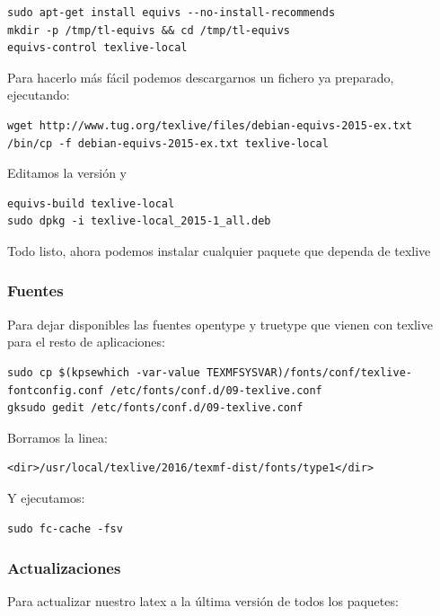 \documentclass[12pt,spanish,]{scrartcl}
\begin{document}
\begin{verbatim}
sudo apt-get install equivs --no-install-recommends
mkdir -p /tmp/tl-equivs && cd /tmp/tl-equivs
equivs-control texlive-local
\end{verbatim}

Para hacerlo más fácil podemos descargarnos un fichero ya preparado,
ejecutando:

\begin{verbatim}
wget http://www.tug.org/texlive/files/debian-equivs-2015-ex.txt
/bin/cp -f debian-equivs-2015-ex.txt texlive-local
\end{verbatim}

Editamos la versión y

\begin{verbatim}
equivs-build texlive-local
sudo dpkg -i texlive-local_2015-1_all.deb
\end{verbatim}

Todo listo, ahora podemos instalar cualquier paquete que dependa de
texlive

\subsubsection{Fuentes}\label{fuentes}

Para dejar disponibles las fuentes opentype y truetype que vienen con
texlive para el resto de aplicaciones:

\begin{verbatim}
sudo cp $(kpsewhich -var-value TEXMFSYSVAR)/fonts/conf/texlive-fontconfig.conf /etc/fonts/conf.d/09-texlive.conf
gksudo gedit /etc/fonts/conf.d/09-texlive.conf
\end{verbatim}

Borramos la linea:

\begin{verbatim}
<dir>/usr/local/texlive/2016/texmf-dist/fonts/type1</dir>
\end{verbatim}

Y ejecutamos:

\begin{verbatim}
sudo fc-cache -fsv
\end{verbatim}

\subsubsection{Actualizaciones}\label{actualizaciones}

Para actualizar nuestro latex a la última versión de todos los paquetes:
\end{document}
